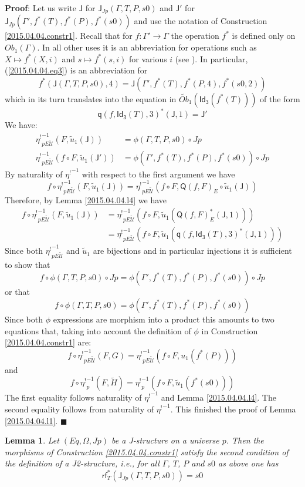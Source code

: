 \documentclass[12pt]{article}
\numberwithin{equation}{section}
\newenvironment{myproof}{{\bf Proof}:}{$\blacksquare$ \vskip 5mm }
\newtheorem{lemma}[proposition]{Lemma}
\newcommand{\llabel}[1]{\label{#1}}
\newcommand{\sr}{\rightarrow}
\newcommand{\wt}{\widetilde}
\newcommand{\q}{\mathsf{q}}
\newcommand{\Idx}{\mathsf{Id_3}} %
\newcommand{\J}{\mathsf{J}}
\newcommand{\U}{\mathcal{U}}
\newcommand{\rf}{\mathsf{rf}}
\newcommand{\Q}{\mathsf{Q}}
\newcommand{\etashriek}{\eta^!}
\newcommand{\etaunshriek}{{\etashriek}^{-1}}
\newcommand{\Obwt}{\wt{Ob}}
\begin{document}
\begin{myproof}
Let us write $\J$ for $\J_{Jp}(\Gamma,T,P,s0)$ and $\J'$ for
$\J_{Jp}(\Gamma',f^*(T),f^*(P),f^*(s0))$ and use the notation of Construction
\ref{2015.04.04.constr1}. Recall that for $f:\Gamma'\sr \Gamma$ the operation
$f^*$ is defined only on $Ob_1(\Gamma)$. In all other uses it is an
abbreviation for operations such as $X\mapsto f^*(X,i)$ and $s\mapsto f^*(s,i)$
for various $i$ (see \cite{Csubsystems}). In particular, (\ref{2015.04.04.eq3})
is an abbreviation for
%
$$f^*(\J(\Gamma,T,P,s0),4)=\J(\Gamma',f^*(T),f^*(P,4),f^*(s0,2))$$
%
which in its turn translates into the equation in $\Obwt_1(\Idx(f^*(T)))$ of
the form
%
$$\q(f,\Idx(T),3)^*(\J,1)=\J'$$
%
We have:
%
\begin{align*}
  \etaunshriek_{pE\wt{\U}}(F,\wt{u}_1(\J))&=\phi(\Gamma,T,P,s0)\circ Jp \\
  \etaunshriek_{pE\wt{\U}}(f\circ F, \wt{u}_1(\J'))&=\phi(\Gamma',f^*(T),f^*(P),f^*(s0))\circ Jp
\end{align*}
%
By naturality of $\etaunshriek$ with respect to the first argument we have
%
$$f\circ \etaunshriek_{pE\wt{\U}}(F,\wt{u}_1(\J))=\etaunshriek_{pE\wt{\U}}(f\circ F,
\Q(f,F)_{E}\circ \wt{u}_1(\J))$$
%
Therefore, by Lemma \ref{2015.04.04.l4} we have
%
\begin{align*}
  f\circ \etaunshriek_{pE\wt{\U}}(F,\wt{u}_1(\J))
    & = \etaunshriek_{pE\wt{\U}}(f\circ F, \wt{u}_1(\Q(f,F)_{E}^*(\J,1))) \\
    & = \etaunshriek_{pE\wt{\U}}(f\circ F, \wt{u}_1(\q(f,\Idx(T),3)^*(\J,1)))
\end{align*}
%
Since both $\etaunshriek_{pE\wt{\U}}$ and $\wt{u}_1$ are bijections and in particular
injections it is sufficient to show that
%
$$f\circ \phi(\Gamma,T,P,s0)\circ Jp = \phi(\Gamma',f^*(T),f^*(P),f^*(s0))\circ
Jp$$
%
or that
%
$$f\circ \phi(\Gamma,T,P,s0)=\phi(\Gamma',f^*(T),f^*(P),f^*(s0))$$
%
Since both $\phi$ expressions are morphism into a product this amounts to two
equations that, taking into account the definition of $\phi$ in Construction
\ref{2015.04.04.constr1} are:
%
$$f\circ \etaunshriek_{pE\wt{\U}}(F,G)=\etaunshriek_{pE\wt{\U}}(f\circ F, u_1(f^*(P)))$$
%
and
%
$$f\circ \etaunshriek_p(F,\wt{H})=\etaunshriek_p(f\circ F, \wt{u}_1(f^*(s0)))$$
%
The first equality follows naturality of $\etaunshriek$ and Lemma
\ref{2015.04.04.l4}. The second equality follows from naturality of
$\etaunshriek$. This finished the proof of Lemma \ref{2015.04.04.l1}.
\end{myproof}
%
\begin{lemma}
\llabel{2015.04.04.l5} Let $(Eq,\Omega,Jp)$ be a J-structure on a universe
$p$. Then the morphisms of Construction \ref{2015.04.04.constr1} satisfy the
second condition of the definition of a J2-structure, i.e., for all $\Gamma$,
$T$, $P$ and $s0$ as above one has
%
$$\rf_T^*(\J_{Jp}(\Gamma,T,P,s0))=s0$$
%
\end{lemma}
\end{document}

